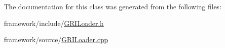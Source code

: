 \-The documentation for this class was generated from the following files\-:\begin{DoxyCompactItemize}
\item 
framework/include/\hyperlink{GRILoader_8h}{\-G\-R\-I\-Loader.\-h}\item 
framework/source/\hyperlink{GRILoader_8cpp}{\-G\-R\-I\-Loader.\-cpp}\end{DoxyCompactItemize}
